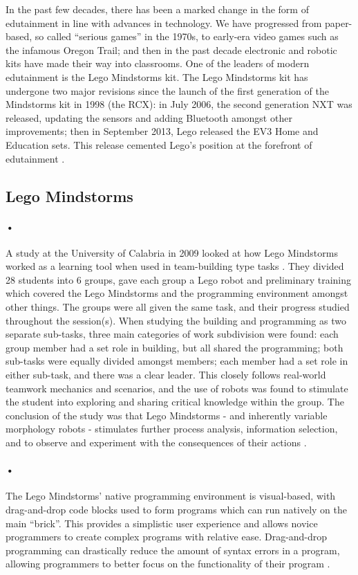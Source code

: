 \documentclass{article}
\begin{document}
In the past few decades, there has been a marked change in the form of edutainment in line with advances in technology. We have progressed from paper-based, so called \enquote{serious games} in the 1970s, to early-era video games such as the infamous Oregon Trail; and then in the past decade electronic and robotic kits have made their way into classrooms. One of the leaders of modern edutainment is the Lego Mindstorms kit. The Lego Mindstorms kit has undergone two major revisions since the launch of the first generation of the Mindstorms kit in 1998 (the RCX): in July 2006, the second generation NXT was released, updating the sensors and adding Bluetooth amongst other improvements; then in September 2013, Lego released the EV3 Home and Education sets. This release cemented Lego’s position at the forefront of edutainment \cite{Becker}.

\subsection{Lego Mindstorms}
\paragraph{•}
A study at the University of Calabria in 2009 \cite{Bilotta2009} looked at how Lego Mindstorms worked as a learning tool when used in team-building type tasks . They divided 28 students into 6 groups, gave each group a Lego robot and preliminary training which covered the Lego Mindstorms and the programming environment amongst other things. The groups were all given the same task, and their progress studied throughout the session(s). When studying the building and programming as two separate sub-tasks, three main categories of work subdivision were found: each group member had a set role in building, but all shared the programming; both sub-tasks were equally divided amongst members; each member had a set role in either sub-task, and there was a clear leader. This closely follows real-world teamwork mechanics and scenarios, and the use of robots was found to stimulate the student into exploring and sharing critical knowledge within the group. The conclusion of the study was that Lego Mindstorms - and inherently variable morphology robots - stimulates further process analysis, information selection, and to observe and experiment with the consequences of their actions \cite{Bilotta2009}.
\paragraph{•}
The Lego Mindstorms' native programming environment is visual-based, with drag-and-drop code blocks used to form programs which can run natively on the main \enquote{brick}. This provides a simplistic user experience and allows novice programmers to create complex programs with relative ease. Drag-and-drop programming can drastically reduce the amount of syntax errors in a program, allowing programmers to better focus on the functionality of their program \cite{Kelleher2002}.
\end{document}
